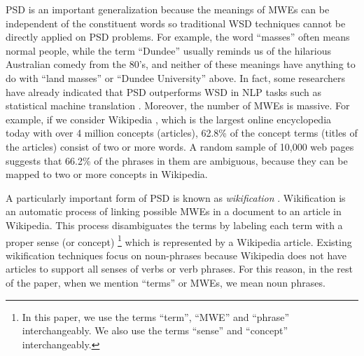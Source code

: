 PSD is an important generalization because
the meanings of MWEs can be independent of the constituent words so traditional
WSD techniques cannot be directly applied on PSD problems. For example,
the word ``masses''  often means normal people, while the term ``Dundee''
usually reminds us of the hilarious Australian comedy from the 80's, and
neither of these meanings have anything to do with ``land masses''
or ``Dundee University'' above.
In fact, some researchers have already indicated that
PSD outperforms WSD in NLP tasks such as statistical
machine translation \cite{carpuat2007phrase}.
Moreover, the number of MWEs is massive. For example, if we consider
Wikipedia \cite{wikipedia},
which is the largest online encyclopedia today with
over 4 million concepts (articles), 62.8\% of the concept terms (titles
of the articles) consist of two or more words. %
A random sample of 10,000 web pages suggests that 66.2\%
of the phrases in them are ambiguous, because they can be mapped to
two or more concepts in Wikipedia.


A particularly important form of PSD is known as
{\em wikification} \cite{MihalceaC07}. Wikification is an automatic process
of linking possible MWEs
in a document to an article in Wikipedia. This process
disambiguates the terms by labeling
each term with a proper sense (or concept) \footnote{In this paper,
we use the terms ``term'', ``MWE'' and ``phrase'' interchangeably.
We also use the terms ``sense'' and ``concept'' interchangeably.}
which is represented by a Wikipedia article.
Existing wikification techniques focus on noun-phrases because Wikipedia
does not have articles to support all senses of verbs or verb phrases.
For this reason, in the rest of the paper, when we mention ``terms'' or
MWEs, we mean noun phrases.


